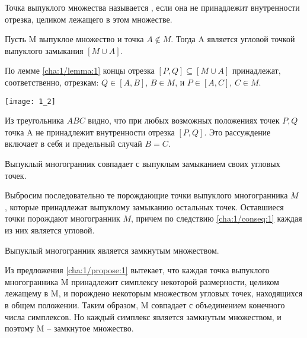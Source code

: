 \begin{definition}\label{cha:1/def:6}
	Точка выпуклого множества называется , если она не принадлежит внутренности отрезка, целиком лежащего в этом множестве.
\end{definition}

\begin{conseq}[]\label{cha:1/conseq:1}
	Пусть M выпуклое множество и точка $A \not \in M$. Тогда A является угловой точкой выпуклого замыкания $[M \cup A]$.
\end{conseq}
\begin{Proof}
	По лемме \ref{cha:1/lemma:1} концы отрезка $[P, Q] \subseteq [M \cup A]$ принадлежат, соответственно, отрезкам: $Q \in [A,B]$, $B \in M$, и $P \in [A, C]$, $C \in M$. 

	\begin{center}
		\texttt{[image: 1\_2]}
	\end{center}

	Из треугольника $ABC$ видно, что при любых возможных положениях точек $P, Q$ точка A не принадлежит внутренности отрезка $[P,Q]$. Это рассуждение включает в себя и предельный случай $B = C$.
\end{Proof}

\begin{theorem}[]\label{cha:1/the:3}
	Выпуклый многогранник совпадает с выпуклым замыканием своих угловых точек.
\end{theorem}
\begin{Proof}
	Выбросим последовательно те порождающие точки выпуклого многогранника $M$ , которые принадлежат выпуклому замыканию остальных точек. Оставшиеся точки порождают многогранник $M$, причем по следствию \ref{cha:1/conseq:1} каждая из них является угловой.
\end{Proof}

\begin{theorem}[]\label{cha:1/the:4}
	Выпуклый многогранник является замкнутым множеством.
\end{theorem}
\begin{Proof}
	Из предложения \ref{cha:1/propose:1} вытекает, что каждая точка выпуклого многогранника M принадлежит симплексу некоторой размерности, целиком лежащему в M, и порождено некоторым множеством угловых точек, находящихся в общем положении. Таким образом, M совпадает с объединением конечного числа симплексов. Но каждый симплекс является замкнутым множеством, и поэтому M – замкнутое множество.
\end{Proof}






















